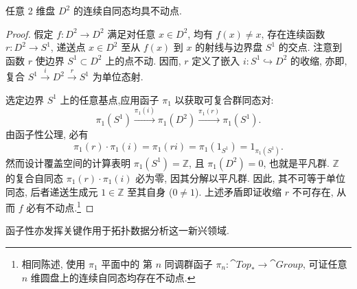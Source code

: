 \begin{theorem}
    任意 2 维盘 \(D^2\) 的连续自同态均具不动点.
\end{theorem}
\begin{proof}
    假定 \(f\colon D^2\to D^2\) 满足对任意 \(x\in D^2\), 均有 \(f(x)\ne x\), 存在连续函数 \(r\colon D^2\to S^1\), 递送点 \(x\in D^2\) 至从 \(f(x)\) 到 \(x\) 的射线与边界盘 \(S^1\) 的交点. 注意到函数 \(r\) 使边界 \(S^1\subset D^2\) 上的点不动. 因而, \(r\) 定义了嵌入 \(i\colon S^1\hookrightarrow D^2\) 的收缩, 亦即, 复合 \(S^1\xrightarrow{i}D^2\xrightarrow{r}S^1\) 为单位态射.
    \begin{figure}[H]
        \centering
    \end{figure}
    \par 选定边界 \(S^1\) 上的任意基点,应用函子 \(\pi_1\) 以获取可复合群同态对:\[
        \pi_1(S^1)\xrightarrow{\pi_1(i)}\pi_1(D^2)\xrightarrow{\pi_1(r)}\pi_1(S^1).
    \]由函子性公理, 必有\[
        \pi_1(r)\cdot\pi_1(i)=\pi_1(ri)=\pi_1(1_{S^1})=1_{\pi_1(S^1)}.
    \]然而设计覆盖空间的计算表明 \(\pi_1(S^1)=\mathbb Z\), 且 \(\pi_1(D^2)=0\), 也就是平凡群. \(\mathbb Z\) 的复合自同态 \(\pi_1(r)\cdot\pi_1(i)\) 必为零, 因其分解以平凡群. 因此, 其不可等于单位同态, 后者递送生成元 \(1\in\mathbb Z\) 至其自身 (\(0\ne1\)). 上述矛盾即证收缩 \(r\) 不可存在, 从而 \(f\) 必有不动点.\footnote{相同陈述, 使用 \(\pi_1\) 平面中的 第 \(n\) 同调群函子 \(\pi_n\colon\cat{Top}_*\to\cat{Group}\), 可证任意  \(n\) 维圆盘上的连续自同态均存在不动点.}
\end{proof}
\par 函子性亦发挥关键作用于拓扑数据分析这一新兴领域.
